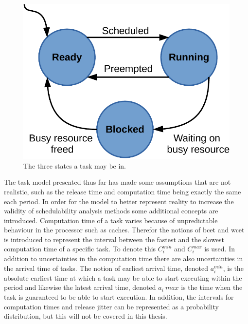 \documentclass{kththesis}
\begin{document}
\begin{figure}

    \centering

    \includegraphics[width=0.7\linewidth]{images/ready-running-blocked-model.pdf}

    \caption{The three states a task may be in.}

    \label{fig:ready_running_blocked_model}

\end{figure}

The task model presented thus far has made some assumptions that are not realistic, such as the
release time and computation time being exactly the same each period. In order for the model to
better represent reality to increase the validity of schedulability analysis methods some additional
concepts are introduced. Computation time of a task varies because of unpredictable behaviour in the
processor such as caches. Therefor the notions of \acrfull{bcet} and \acrfull{wcet} is introduced to
represent the interval between the fastest and the slowest computation time of a specific task.  To
denote this $ C_i^{min} $ and $ C_i^{max} $ is used. In addition to uncertainties in the computation
time there are also uncertainties in the arrival time of tasks. The notion of earliest arrival time,
denoted $ a_i^{min} $, is the  absolute earliest time at which a task may be able to start executing
within the period and likewise the latest arrival time, denoted $ a_i~{max} $ is the time when the
task is guaranteed to be able to start execution. In addition, the intervals for computation times
and release jitter can be represented as a probability distribution, but this will not be covered in
this thesis.


\end{document}
